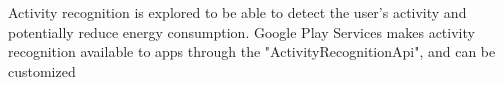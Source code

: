 Activity recognition is explored to be able to detect the user's activity and potentially reduce energy consumption.
Google Play Services makes activity recognition available to apps through the "ActivityRecognitionApi", and can be customized 